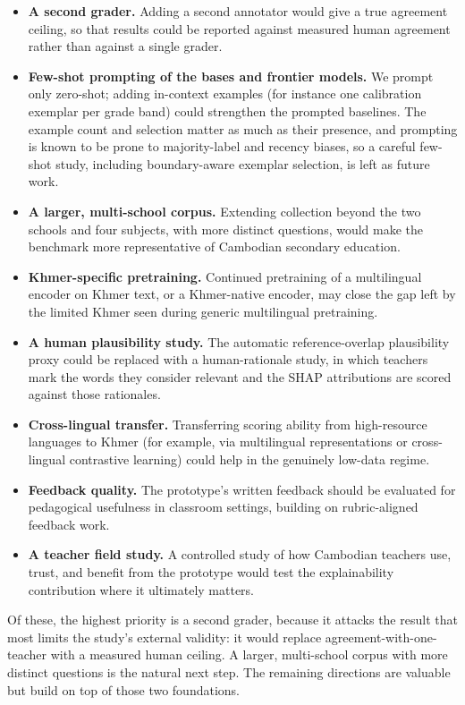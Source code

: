 \begin{itemize}[leftmargin=1.4em]
  \item \textbf{A second grader.} Adding a second annotator would give a true agreement ceiling, so
  that results could be reported against measured human agreement rather than against a single grader.
  \item \textbf{Few-shot prompting of the bases and frontier models.} We prompt only zero-shot; adding
  in-context examples (for instance one calibration exemplar per grade band) could strengthen the
  prompted baselines. The example count and selection matter as much as their presence, and prompting is
  known to be prone to majority-label and recency biases, so a careful few-shot study, including
  boundary-aware exemplar selection, is left as future work.
  \item \textbf{A larger, multi-school corpus.} Extending collection beyond the two schools and four
  subjects, with more distinct questions, would make the benchmark more representative of Cambodian
  secondary education.
  \item \textbf{Khmer-specific pretraining.} Continued pretraining of a multilingual encoder on Khmer
  text, or a Khmer-native encoder, may close the gap left by the limited Khmer seen during generic
  multilingual pretraining.
  \item \textbf{A human plausibility study.} The automatic reference-overlap plausibility proxy could be
  replaced with a human-rationale study, in which teachers mark the words they consider relevant and the
  SHAP attributions are scored against those rationales.
  \item \textbf{Cross-lingual transfer.} Transferring scoring ability from high-resource languages to
  Khmer (for example, via multilingual representations or cross-lingual contrastive learning) could
  help in the genuinely low-data regime.
  \item \textbf{Feedback quality.} The prototype's written feedback should be evaluated for
  pedagogical usefulness in classroom settings, building on rubric-aligned feedback work.
  \item \textbf{A teacher field study.} A controlled study of how Cambodian teachers use, trust, and
  benefit from the prototype would test the explainability contribution where it ultimately matters.
\end{itemize}

Of these, the highest priority is a second grader, because it attacks the result that most limits the
study's external validity: it would replace agreement-with-one-teacher with a measured human ceiling. A
larger, multi-school corpus with more distinct questions is the natural next step. The remaining
directions are valuable but build on top of those two foundations.

